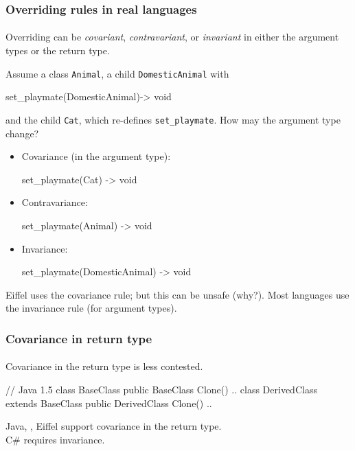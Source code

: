 \documentclass[handout]{beamer}
\begin{document}
\begin{frame}[fragile]
\frametitle{Overriding rules in real languages}
\framesubtitle{}
Overriding can be \textit{covariant}, 
\textit{contravariant}, or \textit{invariant} in either
the argument types or the return type.
\bigskip


Assume a class \texttt{Animal}, a child \texttt{DomesticAnimal} with 
\begin{cplus3}
       set_playmate(DomesticAnimal)->  void 
\end{cplus3}

and the child \texttt{Cat},
which re-defines \texttt{set_playmate}. 
How may the argument type change?%
\begin{itemize}
\item Covariance (in the argument type):
\begin{cplus3}
 set_playmate(Cat) -> void
\end{cplus3}
 \item Contravariance:
\begin{cplus3}
 set_playmate(Animal) -> void
\end{cplus3}
  \item Invariance: 
\begin{cplus3}
 set_playmate(DomesticAnimal) -> void
\end{cplus3}


\end{itemize}
Eiffel uses the covariance rule; but this can be unsafe (why?).
Most languages use the invariance rule (for argument types). 
\end{frame}

\begin{frame}[fragile]
\frametitle{Covariance in return type}
\framesubtitle{}
Covariance in the return type is less contested.
\bigskip

\begin{cplus3}
// Java 1.5
class BaseClass {
    public BaseClass Clone() {..}
}
class DerivedClass extends BaseClass {
    public DerivedClass Clone() {..}
}
\end{cplus3}
Java, \Cpp, Eiffel support covariance in the return type.\\
C\# requires invariance. 
\end{frame}
\end{document}
